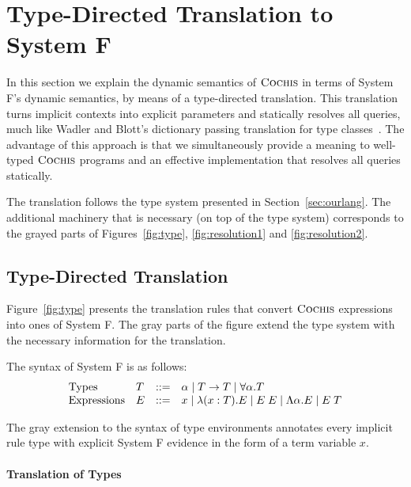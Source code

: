 \section{Type-Directed Translation to System F}
\label{sec:trans}

In this section we explain the dynamic semantics of $\textsc{Cochis}$ in terms
of System F's dynamic semantics, by means of a type-directed translation. 
This translation turns implicit contexts into explicit parameters and
statically resolves all queries, much like Wadler and Blott's dictionary
passing translation for type classes~\cite{adhoc}. 
The advantage of this approach is that we simultaneously provide a meaning to
well-typed $\textsc{Cochis}$ programs and an effective implementation that resolves
all queries statically.

The translation follows the type system presented in Section~\ref{sec:ourlang}.
The additional machinery that is necessary (on top of the type system)
corresponds to the grayed parts of Figures~\ref{fig:type}, \ref{fig:resolution1} and \ref{fig:resolution2}. 

\subsection{Type-Directed Translation}
Figure~\ref{fig:type} presents the translation rules that convert $\textsc{Cochis}$
expressions into ones of System F. 
The gray parts of the figure extend the type system with the necessary
information for the translation.

The syntax of System F is as follows: 
{\small
  \[ \begin{array}{llrl}
    \text{Types} & T & ::= & \alpha \mid T \rightarrow T 
    \mid \forall \alpha. T \\ 
    \text{Expressions} & E & ::=  & x \mid \lambda (x:T) . E \mid E\;E
    \mid \Lambda \alpha . E \mid E\;T 
  \end{array} \]}

The gray extension to the syntax of type environments annotates every
implicit rule type with explicit System F evidence in the form of a 
term variable $x$.

\paragraph{Translation of Types}

